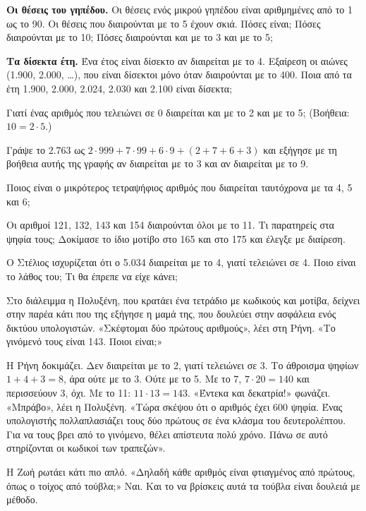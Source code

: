 \ex \textbf{Οι θέσεις του γηπέδου.} Οι θέσεις ενός μικρού γηπέδου είναι αριθμημένες από το 1 ως το 90. Οι θέσεις που διαιρούνται με το 5 έχουν σκιά. Πόσες είναι; Πόσες διαιρούνται με το 10; Πόσες διαιρούνται και με το 3 και με το 5;

\ex \textbf{Τα δίσεκτα έτη.} Ένα έτος είναι δίσεκτο αν διαιρείται με το 4. Εξαίρεση οι αιώνες (1.900, 2.000, \dots), που είναι δίσεκτοι μόνο όταν διαιρούνται με το 400. Ποια από τα έτη 1.900, 2.000, 2.024, 2.030 και 2.100 είναι δίσεκτα;


\ex Γιατί ένας αριθμός που τελειώνει σε 0 διαιρείται και με το 2 και με το 5; (Βοήθεια: $10=2\cdot 5$.)

\ex Γράψε το 2.763 ως $2\cdot 999+7\cdot 99+6\cdot 9+(2+7+6+3)$ και εξήγησε με τη βοήθεια αυτής της γραφής αν διαιρείται με το 3 και αν διαιρείται με το 9.

\ex Ποιος είναι ο μικρότερος τετραψήφιος αριθμός που διαιρείται ταυτόχρονα με τα 4, 5 και 6;

\ex Οι αριθμοί 121, 132, 143 και 154 διαιρούνται όλοι με το 11. Τι παρατηρείς στα ψηφία τους; Δοκίμασε το ίδιο μοτίβο στο 165 και στο 175 και έλεγξε με διαίρεση.

\ex Ο Στέλιος ισχυρίζεται ότι ο 5.034 διαιρείται με το 4, γιατί τελειώνει σε 4. Ποιο είναι το λάθος του; Τι θα έπρεπε να είχε κάνει;


\begin{anagke}
Στο διάλειμμα η Πολυξένη, που κρατάει ένα τετράδιο με κωδικούς και μοτίβα, δείχνει στην παρέα κάτι που της εξήγησε η μαμά της, που δουλεύει στην ασφάλεια ενός δικτύου υπολογιστών. «Σκέφτομαι δύο πρώτους αριθμούς», λέει στη Ρήνη. «Το γινόμενό τους είναι 143. Ποιοι είναι;»

Η Ρήνη δοκιμάζει. Δεν διαιρείται με το 2, γιατί τελειώνει σε 3. Το άθροισμα ψηφίων $1+4+3=8$, άρα ούτε με το 3. Ούτε με το 5. Με το 7, $7\cdot 20=140$ και περισσεύουν 3, όχι. Με το 11: $11\cdot 13=143$. «Έντεκα και δεκατρία!» φωνάζει. «Μπράβο», λέει η Πολυξένη. «Τώρα σκέψου ότι ο αριθμός έχει 600 ψηφία. Ένας υπολογιστής πολλαπλασιάζει τους δύο πρώτους σε ένα κλάσμα του δευτερολέπτου. Για να τους βρει από το γινόμενο, θέλει απίστευτα πολύ χρόνο. Πάνω σε αυτό στηρίζονται οι κωδικοί των τραπεζών».

Η Ζωή ρωτάει κάτι πιο απλό. «Δηλαδή κάθε αριθμός είναι φτιαγμένος από πρώτους, όπως ο τοίχος από τούβλα;» Ναι. Και το να βρίσκεις αυτά τα τούβλα είναι δουλειά με μέθοδο.
\end{anagke}

